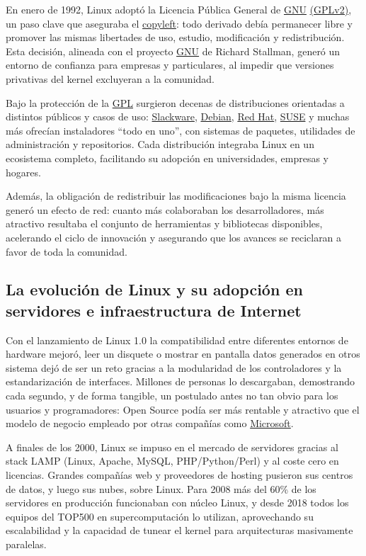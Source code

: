 \documentclass[a4paper,12pt]{article}
\begin{document}
En enero de 1992, Linux adoptó la Licencia Pública General de \hyperref[gnu]{GNU} \hyperref[gpl]{(GPLv2)}, un
paso clave que aseguraba el \hyperref[copyleft]{copyleft}: todo derivado debía permanecer libre y
promover las mismas libertades de uso, estudio, modificación y redistribución. 
Esta decisión, alineada con el proyecto \hyperref[gnu]{GNU} de  Richard Stallman, generó un
entorno de confianza para empresas y particulares, al impedir que versiones
privativas del kernel excluyeran a la comunidad.

Bajo la protección de la \hyperref[gpl]{GPL} surgieron decenas de distribuciones orientadas a
distintos públicos y casos de uso: \hyperref[slackware]{Slackware}, \hyperref[debian]{Debian}, 
\hyperref[redhatcanonical]{Red Hat}, \hyperref[suse]{SUSE} y muchas más
ofrecían instaladores ``todo en uno”, con sistemas de paquetes, utilidades de
administración y repositorios. Cada distribución integraba Linux en un
ecosistema completo, facilitando su adopción en universidades, empresas y
hogares.

Además, la obligación de redistribuir las modificaciones bajo la misma licencia 
generó un efecto de red: cuanto más colaboraban los desarrolladores, más
atractivo resultaba el conjunto de herramientas y bibliotecas disponibles,
acelerando el ciclo de innovación y asegurando que los avances se reciclaran a
favor de toda la comunidad.


\subsection{La evolución de Linux y su adopción en servidores e infraestructura de Internet}

Con el lanzamiento de Linux 1.0 la compatibilidad entre diferentes entornos de
hardware mejoró, leer un disquete o mostrar en pantalla datos generados en otros
sistema dejó de ser un reto gracias a la modularidad de los controladores y la
estandarización de interfaces. Millones de personas lo descargaban, demostrando
cada segundo, y de forma tangible, un postulado antes no tan obvio para los 
usuarios y programadores: Open Source podía ser más rentable y atractivo que el
modelo de negocio empleado por otras compañías como \hyperref[microsoft]{Microsoft}.

A finales de los 2000, Linux se impuso en el mercado de servidores gracias al
stack LAMP (Linux, Apache, MySQL, PHP/Python/Perl) y al coste cero en licencias.
Grandes compañías web y proveedores de hosting pusieron sus centros de datos, y
luego sus nubes, sobre Linux. Para 2008 más del 60\% de los servidores en
producción funcionaban con núcleo Linux, y desde 2018 todos los equipos del
TOP500 en supercomputación lo utilizan, aprovechando su escalabilidad y la 
capacidad de tunear el kernel para arquitecturas masivamente paralelas.
\end{document}
